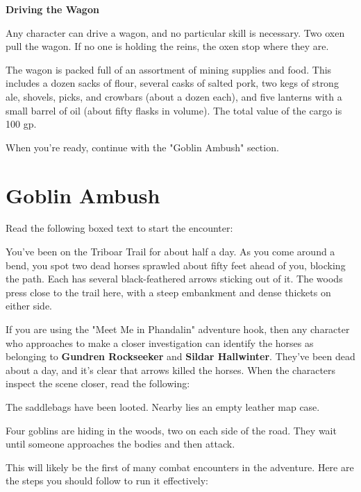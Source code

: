 \documentclass[10pt,a4paper,twoside,bg=print,twocolumn,openany,nodeprecatedcode]{dndbook}
\begin{document}
\textbf{Driving the Wagon}

Any character can drive a wagon, and no particular skill is necessary. Two oxen pull the wagon. If no one is holding the reins, the oxen stop where they are.

The wagon is packed full of an assortment of mining supplies and food. This includes a dozen sacks of flour, several casks of salted pork, two kegs of strong ale, shovels, picks, and crowbars (about a dozen each), and five lanterns with a small barrel of oil (about fifty flasks in volume). The total value of the cargo is 100 gp.

When you're ready, continue with the "Goblin Ambush" section.

\section{Goblin Ambush}
Read the following boxed text to start the encounter:

\begin{DndReadAloud}{}
You've been on the Triboar Trail for about half a day. As you come around a bend, you spot two dead horses sprawled about fifty feet ahead of you, blocking the path. Each has several black-feathered arrows sticking out of it. The woods press close to the trail here, with a steep embankment and dense thickets on either side.

\end{DndReadAloud}

If you are using the "Meet Me in Phandalin" adventure hook, then any character who approaches to make a closer investigation can identify the horses as belonging to \textbf{Gundren Rockseeker} and \textbf{Sildar Hallwinter}. They've been dead about a day, and it's clear that arrows killed the horses. When the characters inspect the scene closer, read the following:

\begin{DndReadAloud}{}
The saddlebags have been looted. Nearby lies an empty leather map case.

\end{DndReadAloud}

Four goblins are hiding in the woods, two on each side of the road. They wait until someone approaches the bodies and then attack.

This will likely be the first of many combat encounters in the adventure. Here are the steps you should follow to run it effectively:
\end{document}
